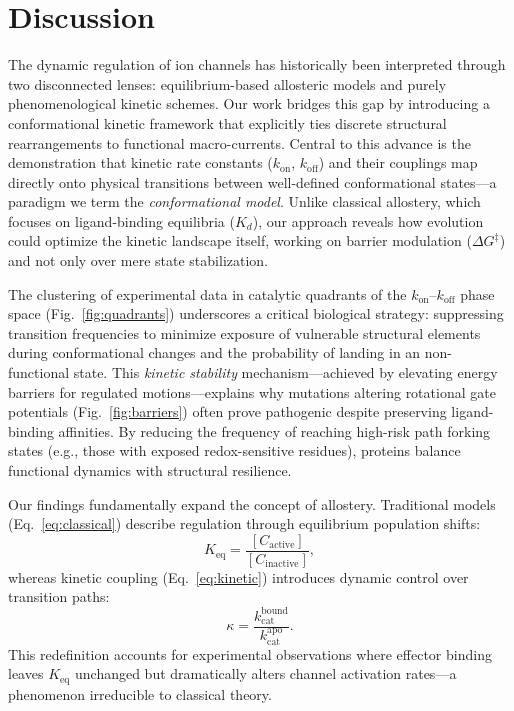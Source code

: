 \documentclass[pdflatex,sn-mathphys-num]{sn-jnl}%
\theoremstyle{thmstyleone}%
\theoremstyle{thmstyletwo}%
\theoremstyle{thmstylethree}%
\begin{document}
\section{Discussion}

The dynamic regulation of ion channels has historically been interpreted through two disconnected lenses: equilibrium-based allosteric models and purely phenomenological kinetic schemes. Our work bridges this gap by introducing a conformational kinetic framework that explicitly ties discrete structural rearrangements to functional macro-currents. Central to this advance is the demonstration that kinetic rate constants ($k_{\text{on}}$, $k_{\text{off}}$) and their couplings map directly onto physical transitions between well-defined conformational states—a paradigm we term the \textit{conformational model}. Unlike classical allostery, which focuses on ligand-binding equilibria ($K_d$), our approach reveals how evolution could optimize the kinetic landscape itself, working on barrier modulation ($\Delta G^{\ddagger}$) and not only over mere state stabilization. 

 

The clustering of experimental data in catalytic quadrants of the $k_{\text{on}}$–$k_{\text{off}}$ phase space (Fig.~\ref{fig:quadrants}) underscores a critical biological strategy: suppressing transition frequencies to minimize exposure of vulnerable structural elements during conformational changes and the probability of landing in an non-functional state. This \textit{kinetic stability} mechanism—achieved by elevating energy barriers for regulated motions—explains why mutations altering rotational gate potentials (Fig.~\ref{fig:barriers}) often prove pathogenic despite preserving ligand-binding affinities. By reducing the frequency of reaching high-risk path forking states (e.g., those with exposed redox-sensitive residues), proteins balance functional dynamics with structural resilience.  

Our findings fundamentally expand the concept of allostery. Traditional models (Eq.~\eqref{eq:classical}) describe regulation through equilibrium population shifts:  
\begin{equation}
	K_{\text{eq}} = \frac{[C_{\text{active}}]}{[C_{\text{inactive}}]}, \label{eq:classical}
\end{equation}  
whereas kinetic coupling (Eq.~\eqref{eq:kinetic}) introduces dynamic control over transition paths:  
\begin{equation}
	\kappa = \frac{k_{\text{cat}}^{\text{bound}}}{k_{\text{cat}}^{\text{apo}}}. \label{eq:kinetic}
\end{equation}  
This redefinition accounts for experimental observations where effector binding leaves $K_{\text{eq}}$ unchanged but dramatically alters channel activation rates—a phenomenon irreducible to classical theory.  
\end{document}
